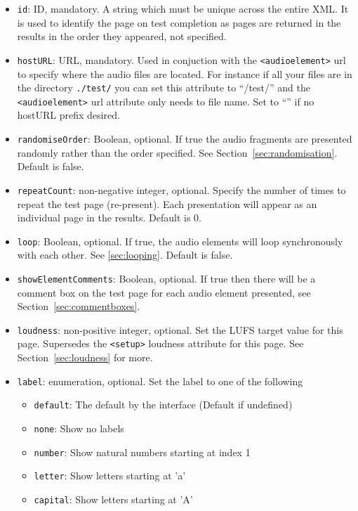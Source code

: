 \documentclass[11pt, oneside]{article}   	%
\begin{document}
        \begin{itemize}
            \item \texttt{id}: ID, mandatory. A string which must be unique across the entire XML. It is used to identify the page on test completion as pages are returned in the results in the order they appeared, not specified.
            \item \texttt{hostURL}: URL, mandatory. Used in conjuction with the \texttt{<audioelement>} url to specify where the audio files are located. For instance if all your files are in the directory \texttt{./test/} you can set this attribute to ``/test/'' and the \texttt{<audioelement>} url attribute only needs to file name. Set to ``'' if no hostURL prefix desired.
            \item \texttt{randomiseOrder}: Boolean, optional. If true the audio fragments are presented randomly rather than the order specified. See Section~\ref{sec:randomisation}. Default is false.
            \item \texttt{repeatCount}: non-negative integer, optional. Specify the number of times to repeat the test page (re-present). Each presentation will appear as an individual page in the results. Default is 0.
            \item \texttt{loop}: Boolean, optional. If true, the audio elements will loop synchronously with each other. See \ref{sec:looping}. Default is false.
            \item \texttt{showElementComments}: Boolean, optional. If true then there will be a comment box on the test page for each audio element presented, see Section~\ref{sec:commentboxes}.
            \item \texttt{loudness}: non-positive integer, optional. Set the LUFS target value for this page. Supersedes the \texttt{<setup>} loudness attribute for this page. See Section~\ref{sec:loudness} for more.
            \item \texttt{label}: enumeration, optional. Set the label to one of the following
            \begin{itemize}
            	\item \texttt{default}: The default by the interface (Default if undefined)
            	\item \texttt{none}: Show no labels
            	\item \texttt{number}: Show natural numbers starting at index 1
            	\item \texttt{letter}: Show letters starting at 'a'
            	\item \texttt{capital}: Show letters starting at 'A'

\end{itemize}
\end{itemize}
\end{document}
